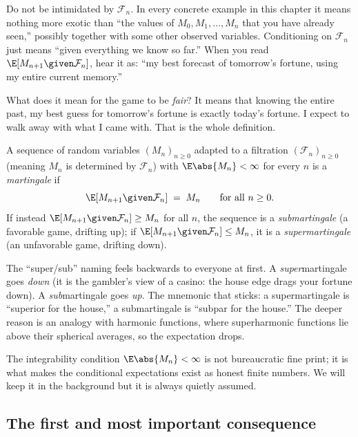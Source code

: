 \begin{intuitionbox}
Do not be intimidated by $\mathcal{F}_n$. In every concrete example in this chapter it means nothing
more exotic than ``the values of $M_0, M_1, \dots, M_n$ that you have already seen,'' possibly together
with some other observed variables. Conditioning on $\mathcal{F}_n$ just means ``given everything we
know so far.'' When you read $\E[M_{n+1} \given \mathcal{F}_n]$, hear it as: ``my best forecast of
tomorrow's fortune, using my entire current memory.''
\end{intuitionbox}

What does it mean for the game to be \emph{fair}? It means that knowing the entire past, my best guess
for tomorrow's fortune is exactly today's fortune. I expect to walk away with what I came with. That is
the whole definition.

\begin{definition}[Martingale]
\label{ch28:def-mtg}
A sequence of random variables $(M_n)_{n \ge 0}$ adapted to a filtration $(\mathcal{F}_n)_{n\ge 0}$
(meaning $M_n$ is determined by $\mathcal{F}_n$) with $\E\abs{M_n} < \infty$ for every $n$ is a
\emph{martingale} if
\[
  \E[M_{n+1} \given \mathcal{F}_n] \;=\; M_n \qquad \text{for all } n \ge 0.
\]
If instead $\E[M_{n+1} \given \mathcal{F}_n] \ge M_n$ for all $n$, the sequence is a
\emph{submartingale} (a favorable game, drifting up); if $\E[M_{n+1} \given \mathcal{F}_n] \le M_n$, it
is a \emph{supermartingale} (an unfavorable game, drifting down).
\end{definition}

\begin{trapbox}
The ``super/sub'' naming feels backwards to everyone at first. A \emph{super}martingale goes
\emph{down} (it is the gambler's view of a casino: the house edge drags your fortune down). A
\emph{sub}martingale goes \emph{up}. The mnemonic that sticks: a supermartingale is ``superior for the
house,'' a submartingale is ``subpar for the house.'' The deeper reason is an analogy with harmonic
functions, where superharmonic functions lie above their spherical averages, so the expectation drops.
\end{trapbox}

The integrability condition $\E\abs{M_n} < \infty$ is not bureaucratic fine print; it is what makes
the conditional expectations exist as honest finite numbers. We will keep it in the background but it
is always quietly assumed.

\subsection{The first and most important consequence}


